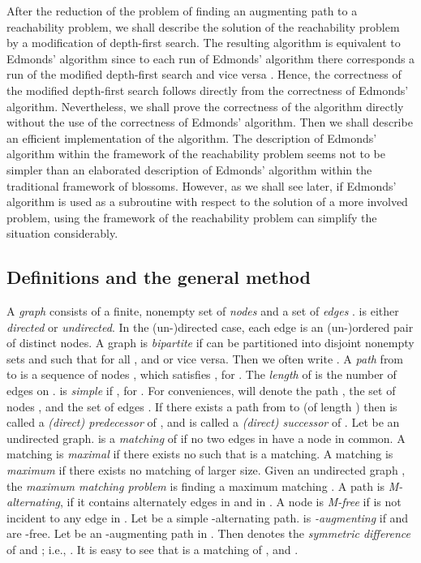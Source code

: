 \documentclass[12pt,twoside,a4paper]{article}
\begin{document}
After the reduction of the problem of finding an augmenting path to a reachability
problem, we shall describe the solution of the reachability problem by a modification
of depth-first search. The resulting algorithm is equivalent to Edmonds' algorithm
since to each run of Edmonds' algorithm there corresponds a run of the modified
depth-first search and vice versa \cite{Ro}. Hence, the correctness of the modified
depth-first search follows directly from the correctness of Edmonds' algorithm.
Nevertheless, we shall prove the correctness of the algorithm directly without
the use of the correctness of Edmonds' algorithm. Then we shall describe an efficient
implementation of the algorithm. The description of Edmonds' algorithm within
the framework of the reachability problem seems not to be simpler than an
elaborated description of Edmonds' algorithm within the traditional framework
of blossoms. However, as we shall see later, if Edmonds' algorithm is used as a 
subroutine with respect to the solution of a more involved problem, using the framework
of the reachability problem can simplify the situation considerably.

\subsection{Definitions and the general method}

A {\em graph}  consists of a finite, nonempty set of {\em nodes\/}
 and a set of {\em edges\/} .  is either {\em directed\/} or
{\em undirected\/}. In the (un-)directed case, each edge is an (un-)ordered
pair of distinct nodes. 
A graph  is {\em bipartite\/} if  can be
partitioned into disjoint nonempty sets  and  such that for all
,  and  or vice versa. Then we often write 
.
A {\em path\/}  from  to  is a sequence of
nodes , which satisfies , for
.
The {\em length\/}  of  is the number  of edges on .  is
{\em simple\/} if , for . For conveniences,
 will denote the path , the set of nodes
, and the set of edges .
If there exists a path from  to  (of length ) then  is called a
{\em (direct) predecessor\/} of , and  is called a {\em (direct) 
successor\/} of .
Let  be an undirected graph.  is a
{\em matching\/} of  if no two edges in  have a node in common.
A matching  is {\em maximal\/} if there exists no  such
that  is a matching. A matching  is {\em maximum\/} if there
exists no matching  of larger size.
Given an undirected graph , the {\em maximum matching problem\/} is
finding a maximum matching .
A path  is {\em M-alternating\/}, if it contains 
alternately edges in  and in .
A node  is {\em M-free\/} if  is not incident to any edge in . 
Let  be a simple -alternating path.  is
{\em -augmenting} if  and  are -free.
Let  be an -augmenting path in . Then  denotes the
{\em symmetric difference\/} of  and ; i.e., .
It is easy to see that  is a matching of , and .
\end{document}
